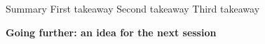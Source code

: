 \documentclass[aspectratio=169,12pt,t]{beamer}
\begin{document}
\resetpart
\begin{frame}{Summary}
  \vspace{0.2cm}
  First takeaway\estep
  Second takeaway\estep
  Third takeaway\estep
  \vspace{0.1cm}
  \begin{darkbox}
    {\bfseries Going further: an idea for the next session}
  \end{darkbox}
\end{frame}
\end{document}
